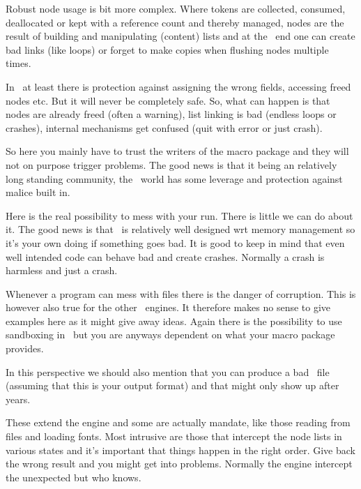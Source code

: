 \stopsection

\startsection[title=Nodes]

Robust node usage is bit more complex. Where tokens are collected, consumed,
deallocated or kept with a reference count and thereby managed, nodes are the
result of building and manipulating (content) lists and at the \LUA\ end one can
create bad links (like loops) or forget to make copies when flushing nodes
multiple times.

In \LUAMETATEX\ at least there is protection against assigning the wrong fields,
accessing freed nodes etc. But it will never be completely safe. So, what can
happen is that nodes are already freed (often a warning), list linking is bad
(endless loops or crashes), internal mechanisms get confused (quit with error or
just crash).

So here you mainly have to trust the writers of the macro package and they will
not on purpose trigger problems. The good news is that it being an relatively
long standing community, the \TEX\ world has some leverage and protection against
malice built in.

\stopsection

\startsection[title=\LUA]

Here is the real possibility to mess with your run. There is little we can do
about it. The good news is that \LUA\ is relatively well designed wrt memory
management so it's your own doing if something goes bad. It is good to keep in
mind that even well intended code can behave bad and create crashes. Normally a
crash is harmless and just a crash.

\stopsection

\startsection[title=Files]

Whenever a program can mess with files there is the danger of corruption. This is
however also true for the other \TEX\ engines. It therefore makes no sense to
give examples here as it might give away ideas. Again there is the possibility to
use sandboxing in \CONTEXT\ but you are anyways dependent on what your macro
package provides.

In this perspective we should also mention that you can produce a bad \PDF\ file
(assuming that this is your output format) and that might only show up after
years.

\stopsection

\startsection[title=Callbacks]

These extend the engine and some are actually mandate, like those reading from files
and loading fonts. Most intrusive are those that intercept the node lists
in various states and it's important that things happen in the right order. Give back
the wrong result and you might get into problems. Normally the engine intercept
the unexpected but who knows.

